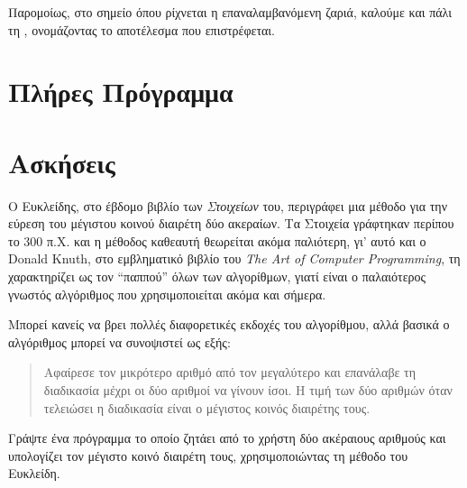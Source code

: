 \documentclass[a4paper,11pt,oneside]{book}
\begin{document}

Παρομοίως, στο σημείο όπου ρίχνεται η επαναλαμβανόμενη ζαριά, καλούμε και πάλι τη , ονομάζοντας  το αποτέλεσμα που επιστρέφεται.




\section{Πλήρες Πρόγραμμα}



\section{Ασκήσεις}

\begin{exercise}
Ο Ευκλείδης, στο έβδομο βιβλίο των \emph{Στοιχείων} του, περιγράφει μια μέθοδο για την εύρεση του μέγιστου κοινού διαιρέτη δύο ακεραίων. Τα Στοιχεία γράφτηκαν περίπου το 300 π.Χ. και η μέθοδος καθεαυτή θεωρείται ακόμα παλιότερη, γι' αυτό και ο Donald Knuth, στο εμβληματικό βιβλίο του \emph{The Art of Computer Programming}, τη χαρακτηρίζει ως τον ``παππού'' όλων των αλγορίθμων, γιατί είναι ο παλαιότερος γνωστός αλγόριθμος που χρησιμοποιείται ακόμα και σήμερα.

Μπορεί κανείς να βρει πολλές διαφορετικές εκδοχές του αλγορίθμου, αλλά βασικά ο αλγόριθμος μπορεί να συνοψιστεί ως εξής:
\begin{quote}
Αφαίρεσε τον μικρότερο αριθμό από τον μεγαλύτερο και επανάλαβε τη διαδικασία μέχρι οι δύο αριθμοί να γίνουν ίσοι. Η τιμή των δύο αριθμών όταν τελειώσει η διαδικασία είναι ο μέγιστος κοινός διαιρέτης τους.
\end{quote}
Γράψτε ένα πρόγραμμα το οποίο ζητάει από το χρήστη δύο ακέραιους αριθμούς και υπολογίζει τον μέγιστο κοινό διαιρέτη τους, χρησιμοποιώντας τη μέθοδο του Ευκλείδη.
\end{exercise}
\end{document}
